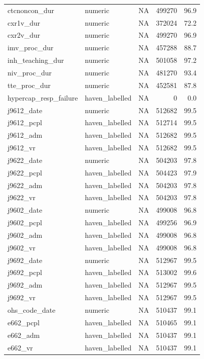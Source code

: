 \documentclass[
  11pt,
  letterpaper,
  DIV=11,
  numbers=noendperiod]{scrartcl}
\begin{document}
\begin{longtable*}{llrrr}
\addlinespace
ctcnoncon\_dur & numeric & NA & 499270 & 96.9\\
cxr1v\_dur & numeric & NA & 372024 & 72.2\\
cxr2v\_dur & numeric & NA & 499270 & 96.9\\
imv\_proc\_dur & numeric & NA & 457288 & 88.7\\
inh\_teaching\_dur & numeric & NA & 501058 & 97.2\\
\addlinespace
niv\_proc\_dur & numeric & NA & 481270 & 93.4\\
tte\_proc\_dur & numeric & NA & 452581 & 87.8\\
hypercap\_resp\_failure & haven\_labelled & NA & 0 & 0.0\\
j9612\_date & numeric & NA & 512682 & 99.5\\
j9612\_pcpl & haven\_labelled & NA & 512714 & 99.5\\
\addlinespace
j9612\_adm & haven\_labelled & NA & 512682 & 99.5\\
j9612\_vr & haven\_labelled & NA & 512682 & 99.5\\
j9622\_date & numeric & NA & 504203 & 97.8\\
j9622\_pcpl & haven\_labelled & NA & 504423 & 97.9\\
j9622\_adm & haven\_labelled & NA & 504203 & 97.8\\
\addlinespace
j9622\_vr & haven\_labelled & NA & 504203 & 97.8\\
j9602\_date & numeric & NA & 499008 & 96.8\\
j9602\_pcpl & haven\_labelled & NA & 499256 & 96.9\\
j9602\_adm & haven\_labelled & NA & 499008 & 96.8\\
j9602\_vr & haven\_labelled & NA & 499008 & 96.8\\
\addlinespace
j9692\_date & numeric & NA & 512967 & 99.5\\
j9692\_pcpl & haven\_labelled & NA & 513002 & 99.6\\
j9692\_adm & haven\_labelled & NA & 512967 & 99.5\\
j9692\_vr & haven\_labelled & NA & 512967 & 99.5\\
ohs\_code\_date & numeric & NA & 510437 & 99.1\\
\addlinespace
e662\_pcpl & haven\_labelled & NA & 510465 & 99.1\\
e662\_adm & haven\_labelled & NA & 510437 & 99.1\\
e662\_vr & haven\_labelled & NA & 510437 & 99.1\\

\end{longtable*}
\end{document}
